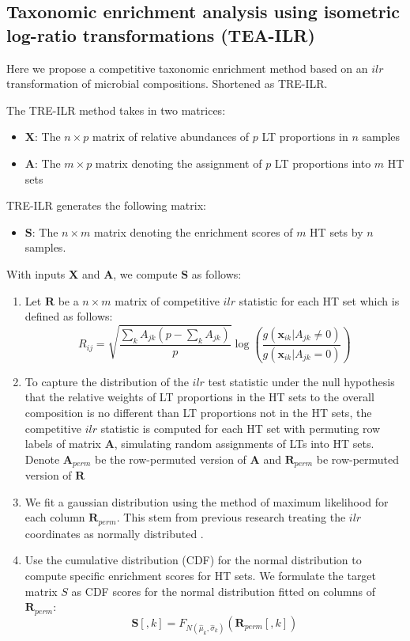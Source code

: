\documentclass{article}
\begin{document}
\subsection{Taxonomic enrichment analysis using isometric log-ratio transformations (TEA-ILR)}
Here we propose a competitive taxonomic enrichment method based on an $ilr$ transformation of microbial compositions. Shortened as TRE-ILR.  
\vspace{3mm}

\noindent The TRE-ILR method takes in two matrices: 
\begin{itemize}
    \item $\bm X$: The $n \times p$ matrix of relative abundances of $p$ LT proportions in $n$ samples
    \item $\bm A$: The $m \times p$ matrix denoting the assignment of $p$ LT proportions into $m$ HT sets
\end{itemize}
TRE-ILR generates the following matrix: 
\begin{itemize}
    \item $\bm S$: The $n \times m$ matrix denoting the enrichment scores of $m$ HT sets by $n$ samples. 
\end{itemize}
With inputs $\bm{X}$ and $\bm{A}$, we compute $\bm{S}$ as follows:  
\begin{enumerate}
    \item Let $\bm{R}$ be a $n \times m$ matrix of competitive $ilr$ statistic for each HT set which is defined as follows:
    \begin{equation}
    R_{ij} = \sqrt{\frac{\sum_k A_{jk}(p - \sum_k A_{jk})}{p}} \log \left(\frac{g(\bm{x}_{ik} |A_{jk} \neq 0)}{g(\bm{x}_{ik} | A_{jk} = 0)}\right)
    \end{equation}
    \item To capture the distribution of the $ilr$ test statistic under the null hypothesis that the relative weights of LT proportions in the HT sets to the overall composition is no different than LT proportions not in the HT sets, the competitive $ilr$ statistic is computed for each HT set with permuting row labels of matrix $\bm{A}$, simulating random assignments of LTs into HT sets. Denote $\bm{A}_{perm}$ be the row-permuted version of $\bm{A}$ and $\bm{R}_{perm}$ be row-permuted version of $\bm{R}$
    \item We fit a gaussian distribution using the method of maximum likelihood for each column $\bm{R}_{perm}$. This stem from previous research treating the $ilr$ coordinates as normally distributed \cite{egozcue2005}.  
    \item Use the cumulative distribution (CDF) for the normal distribution to compute specific enrichment scores for HT sets. We formulate the target matrix $S$ as CDF scores for the normal distribution fitted on columns of $\bm{R}_{perm}$:
    \begin{equation}
        \bm{S}[,k] = F_{N(\hat{\mu}_{k},\hat{\sigma}_{k})}(\bm{R}_{perm}[,k])
    \end{equation}
\end{enumerate}
\end{document}

